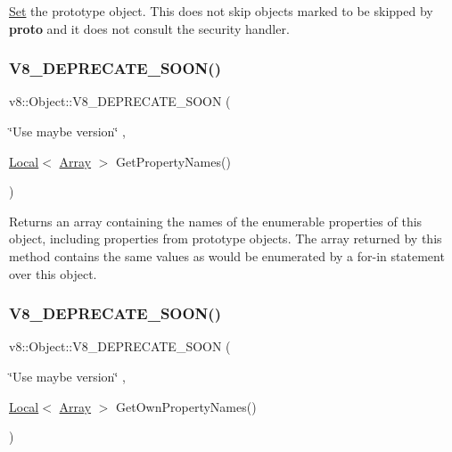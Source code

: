 \mbox{\hyperlink{classv8_1_1Set}{Set}} the prototype object. This does not skip objects marked to be skipped by {\bfseries proto} and it does not consult the security handler. \mbox{\label{classv8_1_1Object_a3f735ad2eab826ddc5eba467ce624acb}} 
\subsubsection{\texorpdfstring{V8\+\_\+\+D\+E\+P\+R\+E\+C\+A\+T\+E\+\_\+\+S\+O\+O\+N()}{V8\_DEPRECATE\_SOON()}\hspace{0.1cm}{\footnotesize\ttfamily [1/2]}}
{\footnotesize\ttfamily v8\+::\+Object\+::\+V8\+\_\+\+D\+E\+P\+R\+E\+C\+A\+T\+E\+\_\+\+S\+O\+ON (\begin{DoxyParamCaption}\item[{\char`\"{}Use maybe version\char`\"{}}]{,  }\item[{\mbox{\hyperlink{classv8_1_1Local}{Local}}$<$ \mbox{\hyperlink{classv8_1_1Array}{Array}} $>$ }]{Get\+Property\+Names() }\end{DoxyParamCaption})}

Returns an array containing the names of the enumerable properties of this object, including properties from prototype objects. The array returned by this method contains the same values as would be enumerated by a for-\/in statement over this object. \mbox{\label{classv8_1_1Object_aa72e9d0d22d1d4a4c4b63827a5469d40}} 
\subsubsection{\texorpdfstring{V8\+\_\+\+D\+E\+P\+R\+E\+C\+A\+T\+E\+\_\+\+S\+O\+O\+N()}{V8\_DEPRECATE\_SOON()}\hspace{0.1cm}{\footnotesize\ttfamily [2/2]}}
{\footnotesize\ttfamily v8\+::\+Object\+::\+V8\+\_\+\+D\+E\+P\+R\+E\+C\+A\+T\+E\+\_\+\+S\+O\+ON (\begin{DoxyParamCaption}\item[{\char`\"{}Use maybe version\char`\"{}}]{,  }\item[{\mbox{\hyperlink{classv8_1_1Local}{Local}}$<$ \mbox{\hyperlink{classv8_1_1Array}{Array}} $>$ }]{Get\+Own\+Property\+Names() }\end{DoxyParamCaption})}

